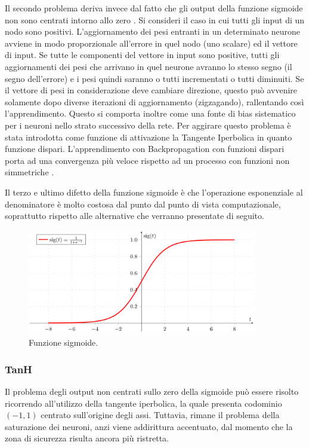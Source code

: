 Il secondo problema deriva invece dal fatto che gli output della funzione sigmoide non sono centrati intorno allo zero \cite{lecun1998gradient}. Si consideri il caso in cui tutti gli input di un nodo sono positivi. L'aggiornamento dei pesi entranti in un determinato neurone avviene in modo proporzionale all'errore in quel nodo (uno scalare) ed il vettore di input. Se tutte le componenti del vettore in input sono positive, tutti gli aggiornamenti dei pesi che arrivano in quel neurone avranno lo stesso segno (il segno dell'errore) e i pesi quindi saranno o tutti incrementati o tutti diminuiti. Se il vettore di pesi in considerazione deve cambiare direzione, questo può avvenire solamente dopo diverse iterazioni di aggiornamento (zigzagando), rallentando così l'apprendimento. Questo si comporta inoltre come una fonte di bias sistematico per i neuroni nello strato successivo della rete. Per aggirare questo problema è stata introdotta come funzione di attivazione la Tangente Iperbolica in quanto funzione dispari. L'apprendimento con Backpropagation con funzioni dispari porta ad una convergenza più veloce rispetto ad un processo con funzioni non simmetriche \cite{haykin2004comprehensive}.

Il terzo e ultimo difetto della funzione sigmoide è che l'operazione esponenziale al denominatore è molto costosa dal punto dal punto di vista computazionale, soprattutto rispetto alle alternative che verranno presentate di seguito.

\begin{figure}[htb]
	\centering
	\includegraphics[width = 100mm]{images/sigmoid.png}
	\caption{Funzione sigmoide.}
	\label{img:sigmoid}
\end{figure}

\subsubsection{TanH}
Il problema degli output non centrati sullo zero \cite{haykin2004comprehensive} della sigmoide può essere risolto ricorrendo all'utilizzo della tangente iperbolica, la quale presenta codominio $(−1, 1)$ centrato sull'origine degli assi. Tuttavia, rimane il problema della saturazione dei neuroni, anzi viene addirittura accentuato, dal momento che la zona di sicurezza risulta ancora più ristretta.

